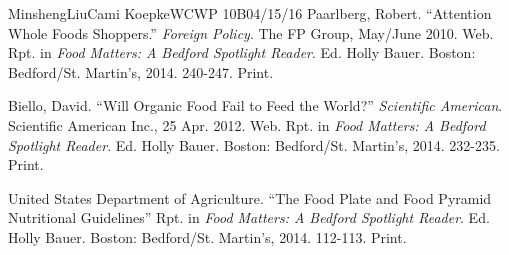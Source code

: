 \documentclass[12pt,letterpaper]{article}
\begin{document}
\begin{mla}{Minsheng}{Liu}{Cami Koepke}{WCWP 10B}{04/15/16}
\bibent Paarlberg, Robert. ``Attention Whole Foods Shoppers.'' \textit{Foreign Policy}. The FP Group, May/June 2010. Web. Rpt. in \textit{Food Matters: A Bedford Spotlight Reader}. Ed. Holly Bauer. Boston: Bedford/St. Martin’s, 2014. 240-247. Print.

\bibent Biello, David. ``Will Organic Food Fail to Feed the World?'' \textit{Scientific American}. Scientific American Inc., 25 Apr. 2012. Web. Rpt. in \textit{Food Matters: A Bedford Spotlight Reader}. Ed. Holly Bauer. Boston: Bedford/St. Martin's, 2014. 232-235. Print.

\bibent United States Department of Agriculture.
``The Food Plate and Food Pyramid Nutritional Guidelines''
Rpt. in \textit{Food Matters: A Bedford Spotlight Reader}.
Ed. Holly Bauer. Boston: Bedford/St. Martin's, 2014. 112-113. Print.

\end{mla}
\end{document}

